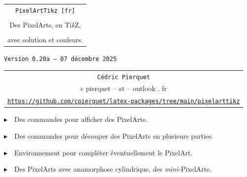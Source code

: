 \documentclass{article}
\def\TPversion{0.20a}
\def\TPdate{07 décembre 2025}
\begin{document}
\pagestyle{fancy}

\thispagestyle{empty}

\vspace{2cm}

\begin{center}
	\begin{minipage}{0.75\linewidth}
	\begin{tcolorbox}[colframe=yellow,colback=yellow!15]
		\begin{center}
			\begin{tabular}{c}
				{\Huge \texttt{PixelArtTikz [fr]}}\\
				\\
				{\LARGE Des PixelArts, en Ti\textit{k}Z}, \\
				\\
				{\LARGE avec solution et couleurs.} \\
			\end{tabular}
			
			\medskip
			
			{\small \texttt{Version \TPversion{} -- \TPdate}}
		\end{center}
	\end{tcolorbox}
\end{minipage}
\end{center}

\vspace{0.5cm}

\begin{center}
	\begin{tabular}{c}
	\texttt{Cédric Pierquet}\\
	{\ttfamily c pierquet -- at -- outlook . fr}\\
	\texttt{\url{https://github.com/cpierquet/latex-packages/tree/main/pixelarttikz}}
\end{tabular}
\end{center}

\vspace{0.25cm}

{$\blacktriangleright$~~Des commandes pour afficher des PixelArts.}

\smallskip

{$\blacktriangleright$~~Des commandes pour découper des PixelArts en plusieurs parties.}

\smallskip

{$\blacktriangleright$~~Environnement pour compléter éventuellement le PixelArt.}

\smallskip

{$\blacktriangleright$~~Des PixelArts avec anamorphose cylindrique, des \textit{mini-}PixelArts.}
\end{document}
